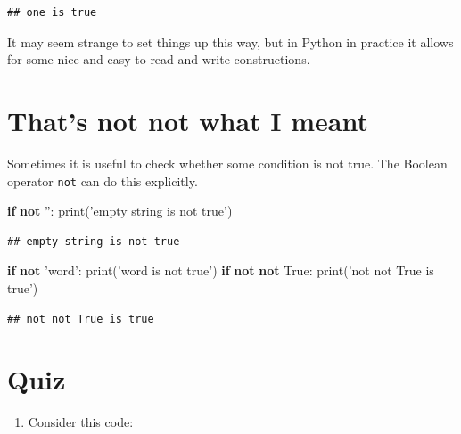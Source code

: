 \documentclass[]{book}
\newenvironment{Shaded}{\begin{snugshade}}{\end{snugshade}}
\newcommand{\BuiltInTok}[1]{#1}
\newcommand{\ControlFlowTok}[1]{\textcolor[rgb]{0.13,0.29,0.53}{\textbf{#1}}}
\newcommand{\KeywordTok}[1]{\textcolor[rgb]{0.13,0.29,0.53}{\textbf{#1}}}
\newcommand{\NormalTok}[1]{#1}
\newcommand{\StringTok}[1]{\textcolor[rgb]{0.31,0.60,0.02}{#1}}
\newcommand{\VariableTok}[1]{\textcolor[rgb]{0.00,0.00,0.00}{#1}}
\providecommand{\tightlist}{%
  \setlength{\itemsep}{0pt}\setlength{\parskip}{0pt}}
\theoremstyle{definition}
\theoremstyle{definition}
\theoremstyle{definition}
\theoremstyle{remark}
\begin{document}
\begin{verbatim}
## one is true
\end{verbatim}

It may seem strange to set things up this way, but in Python in practice
it allows for some nice and easy to read and write constructions.

\hypertarget{thats-not-not-what-i-meant}{%
\section{That's not not what I meant}\label{thats-not-not-what-i-meant}}

Sometimes it is useful to check whether some condition is not true. The
Boolean operator \texttt{not} can do this explicitly.

\begin{Shaded}
\begin{Highlighting}[]
\ControlFlowTok{if} \KeywordTok{not} \StringTok{''}\NormalTok{:}
    \BuiltInTok{print}\NormalTok{(}\StringTok{'empty string is not true'}\NormalTok{)}
\end{Highlighting}
\end{Shaded}

\begin{verbatim}
## empty string is not true
\end{verbatim}

\begin{Shaded}
\begin{Highlighting}[]
\ControlFlowTok{if} \KeywordTok{not} \StringTok{'word'}\NormalTok{:}
    \BuiltInTok{print}\NormalTok{(}\StringTok{'word is not true'}\NormalTok{)}
\ControlFlowTok{if} \KeywordTok{not} \KeywordTok{not} \VariableTok{True}\NormalTok{:}
    \BuiltInTok{print}\NormalTok{(}\StringTok{'not not True is true'}\NormalTok{)}
\end{Highlighting}
\end{Shaded}

\begin{verbatim}
## not not True is true
\end{verbatim}

\hypertarget{quiz-2}{%
\section{Quiz}\label{quiz-2}}

\begin{enumerate}
\def\labelenumi{\arabic{enumi}.}
\tightlist
\item
  Consider this code:
\end{enumerate}
\end{document}
